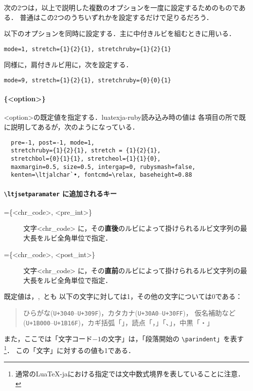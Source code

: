 \documentclass[a4paper,10pt]{ltjsarticle}
\def\cs#1{\eghostguarded{\texttt{\textbackslash#1}}}
\def\LuaTeX{Lua\TeX}
\begin{document}
\medskip
次の2つは，以上で説明した複数のオプションを一度に設定するためのものである．
普通はこの2つのうちいずれかを設定するだけで足りるだろう．

\begin{description}
\def\makelabel#1{\ttfamily\bfseries #1}
\item[naka] 以下のオプションを同時に設定する．主に中付きルビを組むときに用いる．
\begin{verbatim}
mode=1, stretch={1}{2}{1}, stretchruby={1}{2}{1}
\end{verbatim}
\item[kata] 同様に，肩付きルビ用に，次を設定する．
\begin{verbatim}
mode=9, stretch={1}{2}{1}, stretchruby={0}{0}{1}
\end{verbatim}
\end{description}

\paragraph{\cs{ltjsetruby}\{<option>\}}
<option>の既定値を指定する．\textsf{luatexja-ruby}読み込み時の値は
各項目の所で既に説明してあるが，次のようになっている．
\begin{verbatim}
  pre=-1, post=-1, mode=1, 
  stretchruby={1}{2}{1}, stretch = {1}{2}{1},
  stretchbol={0}{1}{1}, stretcheol={1}{1}{0},
  maxmargin=0.5, size=0.5, intergap=0, rubysmash=false,
  kenten=\ltjalchar`•, fontcmd=\relax, baseheight=0.88
\end{verbatim}

\paragraph{\texttt{\textbackslash ltjsetparamater} に追加されるキー}
\begin{description}
\item[\ttfamily =\{<chr\_code>, <pre\_int>\}]
文字<chr\_code> に，その\textbf{直後}のルビによって掛けられるルビ文字列の最大長をルビ全角単位で指定．
\item[\ttfamily =\{<chr\_code>, <post\_int>\}]
文字<chr\_code> に，その\textbf{直前}のルビによって掛けられるルビ文字列の最大長をルビ全角単位で指定．
\end{description}
既定値は，,~とも
以下の文字に対しては1，その他の文字については0である：
\begin{quote}
 ひらがな(\texttt{U+3040}--\texttt{U+309F})，カタカナ(\texttt{U+30A0}--\texttt{U+30FF})，
 仮名補助など(\texttt{U+1B000}--\texttt{U+1B16F})，カギ括弧「」，読点「，」「、」，中黒「・」
\end{quote}
また，ここでは「文字コード$-1$の文字」は，「段落開始の \verb+\parindent+」を表す%
\footnote{通常の\LuaTeX-jaにおける指定では文中数式境界を表していることに注意．}．
この「文字」に対するの値も1である．
\end{document}
